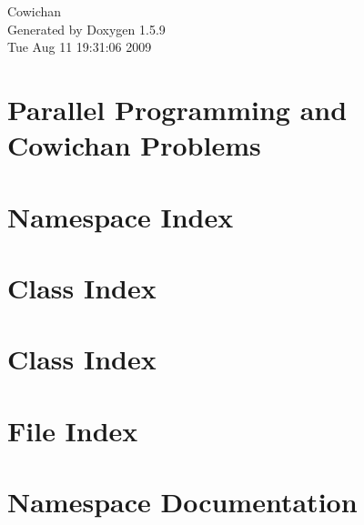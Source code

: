 \documentclass[a4paper]{book}
\begin{document}
\hypersetup{pageanchor=false}
\begin{titlepage}
\vspace*{7cm}
\begin{center}
{\Large Cowichan }\\
\vspace*{1cm}
{\large Generated by Doxygen 1.5.9}\\
\vspace*{0.5cm}
{\small Tue Aug 11 19:31:06 2009}\\
\end{center}
\end{titlepage}
\clearemptydoublepage
{}
\tableofcontents
\clearemptydoublepage
{}
\hypersetup{pageanchor=true}
\chapter{Parallel Programming and Cowichan Problems}
\label{index}\hypertarget{index}{}
\chapter{Namespace Index}

\chapter{Class Index}

\chapter{Class Index}

\chapter{File Index}

\chapter{Namespace Documentation}




\end{document}
